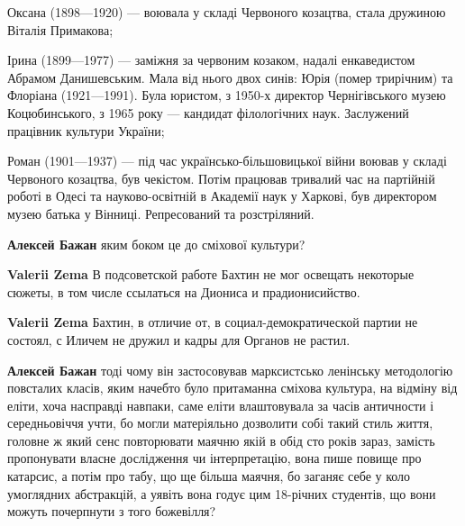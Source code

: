 \begin{itemize}
\begin{itemize}
Оксана (1898—1920) — воювала у складі Червоного козацтва, стала дружиною
Віталія Примакова;

Ірина (1899—1977) — заміжня за червоним козаком, надалі енкаведистом Абрамом
Данишевським. Мала від нього двох синів: Юрія (помер трирічним) та Флоріана
(1921—1991). Була юристом, з 1950-х директор Чернігівського музею
Коцюбинського, з 1965 року — кандидат філологічних наук. Заслужений працівник
культури України;

Роман (1901—1937) — під час українсько-більшовицької війни воював у складі
Червоного козацтва, був чекістом. Потім працював тривалий час на партійній
роботі в Одесі та науково-освітній в Академії наук у Харкові, був директором
музею батька у Вінниці. Репресований та розстріляний.


 
\textbf{Алексей Бажан} яким боком це до сміхової культури?

 
\textbf{Valerii Zema} В подсоветской работе Бахтин не мог освещать некоторые сюжеты, в том числе ссылаться на Диониса и прадионисийство.

 
\textbf{Valerii Zema} Бахтин, в отличие от, в социал-демократической партии не состоял, с Иличем не дружил и кадры для Органов не растил.

 
\textbf{Алексей Бажан} тоді чому він застосовував марксистсько ленінську методологію повсталих класів, яким начебто було притаманна сміхова культура, на відміну від еліти, хоча насправді навпаки, саме еліти влаштовувала за часів античности і середньовіччя учти, бо могли матеріяльно дозволити собі такий стиль життя, головне ж який сенс повторювати маячню якій в обід сто років зараз, замість пропонувати власне дослідження чи інтерпретацію, вона пише повище про катарсис, а потім про табу, що ще більша маячня, бо заганяє себе у коло умоглядних абстракцій, а уявіть вона годує цим 18-річних студентів, що вони можуть почерпнути з того божевілля?


\end{itemize}
\end{itemize}
